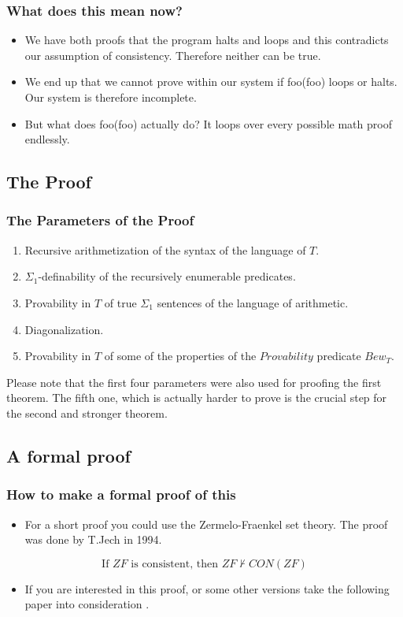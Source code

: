 \documentclass[aspectratio=169]{beamer}
\begin{document}
\begin{frame}
	\frametitle{What does this mean now?}
	\begin{itemize}
		\item We have both proofs that the program halts and loops and this contradicts our assumption of consistency. Therefore neither can be true.
		\item We end up that we cannot prove within our system if foo(foo) loops or halts. Our system is therefore incomplete.
		\item But what does foo(foo) actually do? It loops over every possible math proof endlessly.
	\end{itemize}
\end{frame}

\subsection{The Proof}
\begin{frame}
	\frametitle{The Parameters of the Proof}
	\begin{enumerate}
		\item Recursive arithmetization of the syntax of the language of $T$.
		\item $\Sigma_1$-definability of the recursively enumerable predicates.
		\item Provability in $T$ of true $\Sigma_1$ sentences of the language of arithmetic.
		\item Diagonalization.
		\item Provability in $T$ of some of the properties of the $Provability$ predicate $Bew_T$.
	\end{enumerate}
	Please note that the first four parameters were also used for proofing the first theorem. The fifth one, which is actually harder to prove is the crucial step for the second and stronger theorem.
	\begin{flushright}
		\cite{bag}
	\end{flushright}
\end{frame}

\subsection{A formal proof}
\begin{frame}
	\frametitle{How to make a formal proof of this}
	\begin{itemize}
		\item For a short proof you could use the Zermelo-Fraenkel set theory. The proof was done by T.Jech in 1994.
	\end{itemize}
	
	\begin{Theorem}
		\[\text{If } ZF \text{ is consistent, then } ZF \nvdash CON(ZF)\]
	\end{Theorem}
	
		\begin{itemize}
		\item If you are interested in this proof, or some other versions take the following paper into consideration \cite{bag}.
	\end{itemize}
\end{frame}
\end{document}
